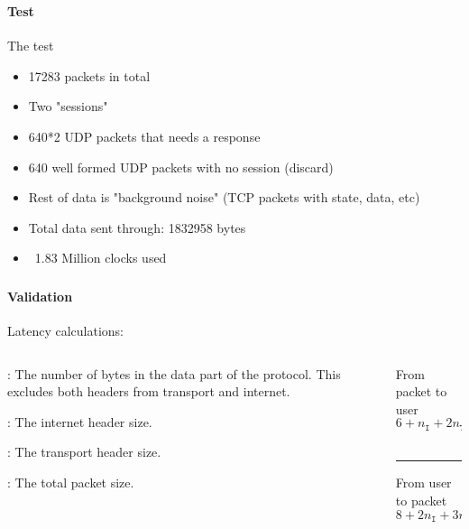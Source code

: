 \begin{frame}%
    \frametitle{\EvaluationTitle}
    \framesubtitle{Test}
    The test
    \begin{itemize}%
        \item 17283 packets in total
        \item Two "sessions"
        \item 640*2 UDP packets that needs a response
        \item 640 well formed UDP packets with no session (discard)
        \item Rest of data is "background noise" (TCP packets with state, data, etc)
        \item Total data sent through: 1832958 bytes
        \item ~1.83 Million clocks used
    \end{itemize}
\end{frame}

\begin{frame}%
    \frametitle{\EvaluationTitle}
    \framesubtitle{Validation}
    Latency calculations:
    \begin{columns}
        \begin{column}{0.60\textwidth}
            \begin{description}[$n_{\mathtt{T}}$]
                \item[$n_{\mathtt{D}}$]:
                The number of bytes in the data part of the protocol. This excludes both
                headers from transport and internet.
                \item[$n_{\mathtt{I}}$]:
                The internet header size.
                \item[$n_{\mathtt{T}}$]:
                The transport header size.
                \item[$n$]:\quad
                The total packet size.
            \end{description}
        \end{column}
        \begin{column}{0.40\textwidth}
            From packet to user
            \begin{equation*}
                6 + n_{\mathtt{I}} + 2n_{\mathtt{T}} + 3n_{\mathtt{D}}
           \end{equation*}\\
           \noindent\rule{8cm}{0.4pt}
           From user to packet
           \begin{equation*}
            8 + 2n_{\mathtt{I}} + 3n_{\mathtt{T}} + 4n_{\mathtt{D}}
            \end{equation*}
        \end{column}
    \end{columns}
\end{frame}

